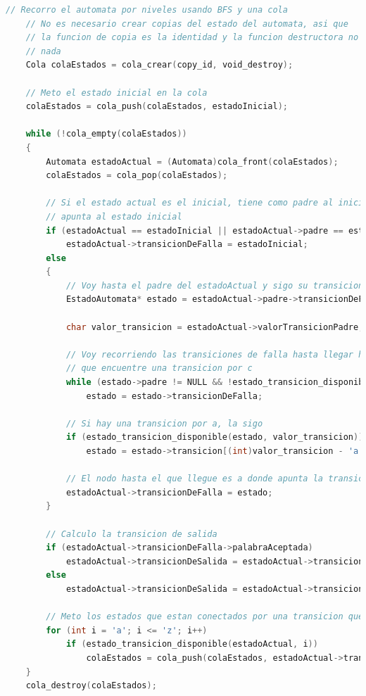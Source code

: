 \documentclass{article}
\begin{document}
\begin{lstlisting}[language=C]
    // Recorro el automata por niveles usando BFS y una cola
    // No es necesario crear copias del estado del automata, asi que
    // la funcion de copia es la identidad y la funcion destructora no hace
    // nada
    Cola colaEstados = cola_crear(copy_id, void_destroy);

    // Meto el estado inicial en la cola
    colaEstados = cola_push(colaEstados, estadoInicial);

    while (!cola_empty(colaEstados))
    {
        Automata estadoActual = (Automata)cola_front(colaEstados);
        colaEstados = cola_pop(colaEstados);

        // Si el estado actual es el inicial, tiene como padre al inicial o es un estado de aceptacion, su transicion de falla
        // apunta al estado inicial
        if (estadoActual == estadoInicial || estadoActual->padre == estadoInicial || estadoActual->palabraAceptada)
            estadoActual->transicionDeFalla = estadoInicial;
        else
        {
            // Voy hasta el padre del estadoActual y sigo su transicion de falla
            EstadoAutomata* estado = estadoActual->padre->transicionDeFalla;

            char valor_transicion = estadoActual->valorTransicionPadre;
            
            // Voy recorriendo las transiciones de falla hasta llegar hasta la raiz o hasta
            // que encuentre una transicion por c
            while (estado->padre != NULL && !estado_transicion_disponible(estado, valor_transicion))
                estado = estado->transicionDeFalla;
            
            // Si hay una transicion por a, la sigo
            if (estado_transicion_disponible(estado, valor_transicion))
                estado = estado->transicion[(int)valor_transicion - 'a'];
            
            // El nodo hasta el que llegue es a donde apunta la transicion de falla de N
            estadoActual->transicionDeFalla = estado;
        }
        
        // Calculo la transicion de salida
        if (estadoActual->transicionDeFalla->palabraAceptada)
            estadoActual->transicionDeSalida = estadoActual->transicionDeFalla;
        else
            estadoActual->transicionDeSalida = estadoActual->transicionDeFalla->transicionDeSalida;

        // Meto los estados que estan conectados por una transicion que no es de falla en la cola
        for (int i = 'a'; i <= 'z'; i++)
            if (estado_transicion_disponible(estadoActual, i))
                colaEstados = cola_push(colaEstados, estadoActual->transicion[i - 'a']);
    }
    cola_destroy(colaEstados);
\end{lstlisting}
\end{document}

